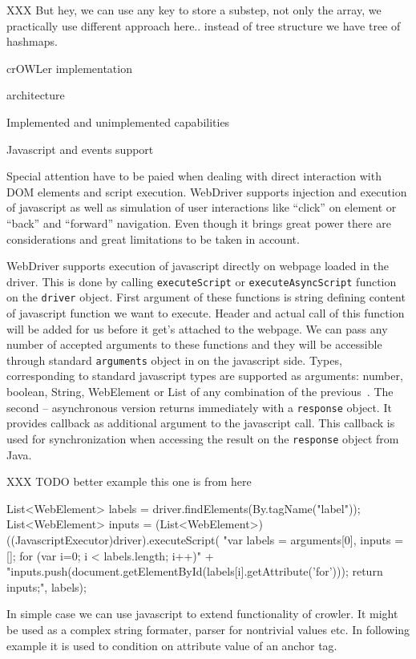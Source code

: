 XXX But hey, we can use any key to store a substep, not only the array, we
practically use different approach here.. instead of tree structure we have
tree of hashmaps. 

\sec crOWLer implementation

\secc architecture

\secc Implemented and unimplemented capabilities

\secc Javascript and events support

Special attention have to be paied when dealing with direct interaction with
DOM elements and script execution. WebDriver supports injection and execution
of javascript as well as simulation of user interactions like ``click'' on
element or ``back'' and ``forward'' navigation. Even though it brings great
power there are considerations and great limitations to be taken in account. 

WebDriver supports execution of javascript directly on webpage loaded in the
driver. This is done by calling {\tt executeScript} or {\tt executeAsyncScript}
function on the {\tt driver} object. First argument of these functions is
string defining content of javascript function we want to execute. Header and
actual call of this function will be added for us before it get's attached to
the webpage. We can pass any number of accepted arguments to these functions
and they will be accessible through standard {\tt arguments} object in on the
javascript side. Types, corresponding to standard javascript types are
supported as arguments: number, boolean, String, WebElement or List of any
combination of the previous~. The second -- asynchronous version returns
immediately with a {\tt response} object. It provides callback as additional
argument to the javascript call. This callback is used for synchronization when
accessing the result on the {\tt response} object from Java.  

XXX TODO better example this one is from
here~

\begtt
List<WebElement> labels = driver.findElements(By.tagName("label"));
List<WebElement> inputs = (List<WebElement>) ((JavascriptExecutor)driver).executeScript(
    "var labels = arguments[0], inputs = []; for (var i=0; i < labels.length; i++){" +
        "inputs.push(document.getElementById(labels[i].getAttribute('for'))); } return inputs;", labels);
\endtt

In simple case we can use javascript to extend functionality of crowler. It
might be used as a complex string formater, parser for nontrivial values etc. 
In following example it is used to condition on attribute value of an anchor
tag. 

